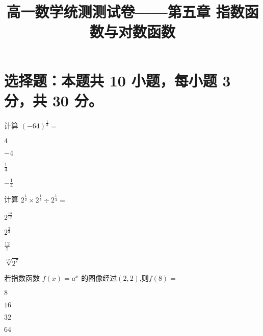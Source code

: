 \documentclass{exam-zh}
\title{高一数学统测测试卷——第五章 指数函数与对数函数}
\begin{document}
 

\maketitle

    \section{选择题：本题共 10 小题，每小题 3 分，共 30 分。}



    \begin{question}
        计算 $(-64)^{\frac{1}{3}} = $\paren[B]
        \begin{choices}
        \item $4$
        \item $-4$
        \item $\frac{1}{4}$
        \item $-\frac{1}{4}$
        \end{choices}
    \end{question}



    \begin{question}
        计算 $ 2^{\frac{1}{2}} \times 2^{\frac{1}{3}} \div 2^{\frac{1}{4}}    = $\paren[D]
        \begin{choices}
        \item $2^{\frac{13}{12}}$
        \item $2^{\frac{2}{3}}$
        \item $\frac{12}{7}$
        \item $\sqrt[12]{2^7}$
        \end{choices}
    \end{question}




    \begin{question}
      若指数函数 $f(x) = a^x$ 的图像经过$(2,2)$,则$f(8) = $\paren[B]
      \begin{choices}
      \item $8$
      \item $16$
      \item $32$
      \item $64$
      \end{choices}
    \end{question}
\end{document}
